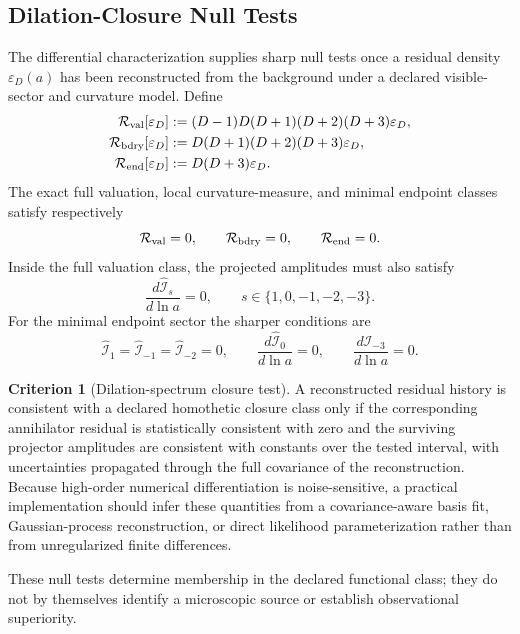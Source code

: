 \documentclass[11pt,a4paper]{article}
\def\dd{d}%
\def\Dil{D}%
\numberwithin{equation}{section}
\theoremstyle{definition}
\newtheorem{criterion}{Criterion}
\theoremstyle{plain}
\theoremstyle{remark}
\newcommand{\Dil}{\mathscr{D}}
\newcommand{\epsD}{\varepsilon_D}
\newcommand{\dd}{\mathrm{d}}
\begin{document}
\subsection{Dilation-Closure Null Tests}
The differential characterization supplies sharp null tests once a residual density \(\epsD(a)\) has been reconstructed from the background under a declared visible-sector and curvature model. Define
\begin{align}
\mathcal R_{\rm val}[\epsD]
&:=(\Dil-1)\Dil(\Dil+1)(\Dil+2)(\Dil+3)\epsD,
\\
\mathcal R_{\rm bdry}[\epsD]
&:=\Dil(\Dil+1)(\Dil+2)(\Dil+3)\epsD,
\\
\mathcal R_{\rm end}[\epsD]
&:=\Dil(\Dil+3)\epsD.
\end{align}
The exact full valuation, local curvature-measure, and minimal endpoint classes satisfy respectively
\begin{equation}
\mathcal R_{\rm val}=0,
\qquad
\mathcal R_{\rm bdry}=0,
\qquad
\mathcal R_{\rm end}=0.
\end{equation}
Inside the full valuation class, the projected amplitudes must also satisfy
\begin{equation}
\frac{\dd\widehat{\mathcal I}_s}{\dd\ln a}=0,
\qquad
s\in\{1,0,-1,-2,-3\}.
\end{equation}
For the minimal endpoint sector the sharper conditions are
\begin{equation}
\widehat{\mathcal I}_1
=\widehat{\mathcal I}_{-1}
=\widehat{\mathcal I}_{-2}=0,
\qquad
\frac{\dd\widehat{\mathcal I}_0}{\dd\ln a}=0,
\qquad
\frac{\dd\widehat{\mathcal I}_{-3}}{\dd\ln a}=0.
\end{equation}

\begin{criterion}[Dilation-spectrum closure test]
A reconstructed residual history is consistent with a declared homothetic closure class only if the corresponding annihilator residual is statistically consistent with zero and the surviving projector amplitudes are consistent with constants over the tested interval, with uncertainties propagated through the full covariance of the reconstruction. Because high-order numerical differentiation is noise-sensitive, a practical implementation should infer these quantities from a covariance-aware basis fit, Gaussian-process reconstruction, or direct likelihood parameterization rather than from unregularized finite differences.
\end{criterion}

These null tests determine membership in the declared functional class; they do not by themselves identify a microscopic source or establish observational superiority.
\end{document}
